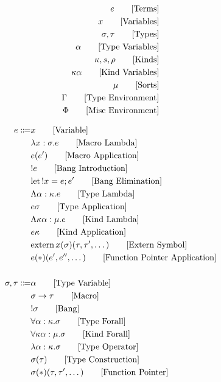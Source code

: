 \documentclass {article}
\begin{document}
\Large

\begin{align*}
e \tag* {[Terms]} \\
x \tag* {[Variables]} \\
\sigma, \tau \tag* {[Types]} \\
\alpha \tag* {[Type Variables]} \\
\kappa, s, \rho \tag* {[Kinds]} \\
\kappa \alpha \tag*{[Kind Variables]} \\
\mu \tag*{[Sorts]} \\
\Gamma \tag* {[Type Environment]} \\
\Phi \tag* {[Misc Environment]}
\end{align*}

\begin{align*}
e \Coloneqq & x \tag*{[Variable]}\\
& \lambda x : \sigma. e \tag*{[Macro Lambda]}\\
& e(e') \tag*{[Macro Application]}\\
& !e \tag*{[Bang Introduction]} \\
& \text{let} \, !x = e; e' \tag*{[Bang Elimination]} \\ 
& \Lambda \alpha : \kappa. e \tag*{[Type Lambda]} \\
& e \sigma \tag*{[Type Application]} \\
& \Lambda \kappa \alpha : \mu. e \tag*{[Kind Lambda]} \\
& e \kappa \tag*{[Kind Application]} \\
& \text{extern} \, x (\sigma) (\tau, \tau', \dots) \tag*{[Extern Symbol]} \\
& e(*)(e',e'',\dots) \tag*{[Function Pointer Application]} \\
\\
\sigma, \tau \Coloneqq & \alpha \tag* {[Type Variable]}\\
& \sigma \to \tau \tag*{[Macro]}\\
& !\sigma \tag*{[Bang]} \\
& \forall \alpha : \kappa. \sigma \tag*{[Type Forall]}\\ 
& \forall \kappa \alpha : \mu. \sigma \tag*{[Kind Forall]}\\
& \lambda \alpha : \kappa. \sigma \tag*{[Type Operator]} \\
& \sigma (\tau) \tag*{[Type Construction]} \\
& \sigma (*) (\tau, \tau', \dots) \tag*{[Function Pointer]}\\

\end{align*}
\end{document}
